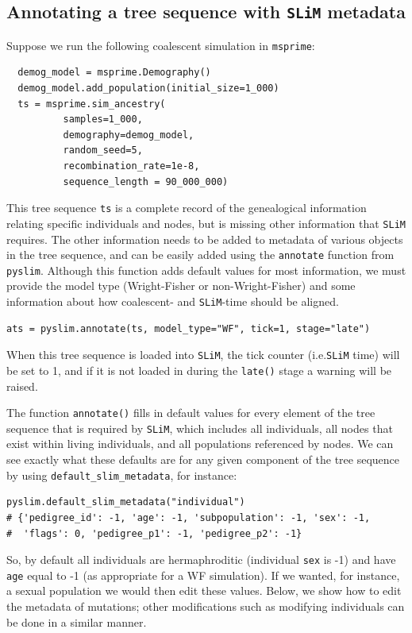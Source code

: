 \documentclass[12pt]{article}
\newcommand{\msprime}[0]{\texttt{msprime}\xspace}
\newcommand{\slim}[0]{\texttt{SLiM}\xspace}
\newcommand{\pyslim}[0]{\texttt{pyslim}\xspace}
\newcommand*{\ie}{i.e.\xcomma}
\begin{document}
\subsection{Annotating a tree sequence with \slim metadata}

Suppose we run the following coalescent simulation in \msprime:
\begin{verbatim}
  demog_model = msprime.Demography()
  demog_model.add_population(initial_size=1_000)
  ts = msprime.sim_ancestry(
          samples=1_000,
          demography=demog_model,
          random_seed=5,
          recombination_rate=1e-8,
          sequence_length = 90_000_000)
\end{verbatim}
This tree sequence \verb|ts| is a complete record of the genealogical information relating specific individuals
and nodes, but is missing other information that  \slim requires.
The other information needs to be added to metadata of various objects in the tree sequence,
and can be easily added using the \verb|annotate| function from \pyslim.
Although this function adds default values for most information,
we must provide the model type (Wright-Fisher or non-Wright-Fisher)
and some information about how coalescent- and \slim-time should be aligned.
\begin{verbatim}
ats = pyslim.annotate(ts, model_type="WF", tick=1, stage="late")
\end{verbatim}
When this tree sequence is loaded into \slim, the tick counter (\ie \slim time)
will be set to 1, and if it is not loaded in during the \verb|late()| stage a warning will be raised.

The function \verb|annotate()| fills in default values for every element of the tree sequence that is required by \slim,
which includes all individuals, all nodes that exist within living individuals, and all
populations referenced by nodes. We can see exactly what these defaults
are for any given component of the tree sequence by using \verb|default_slim_metadata|,
for instance:
\begin{verbatim}
pyslim.default_slim_metadata("individual")
# {'pedigree_id': -1, 'age': -1, 'subpopulation': -1, 'sex': -1,
#  'flags': 0, 'pedigree_p1': -1, 'pedigree_p2': -1}
\end{verbatim}
So, by default all individuals are hermaphroditic (individual \verb|sex| is -1)
and have \verb|age| equal to -1 (as appropriate for a WF simulation).
If we wanted, for instance, a sexual population we would then edit these values.
Below, we show how to edit the metadata of mutations; other modifications such as modifying individuals
can be done in a similar manner.
\end{document}
